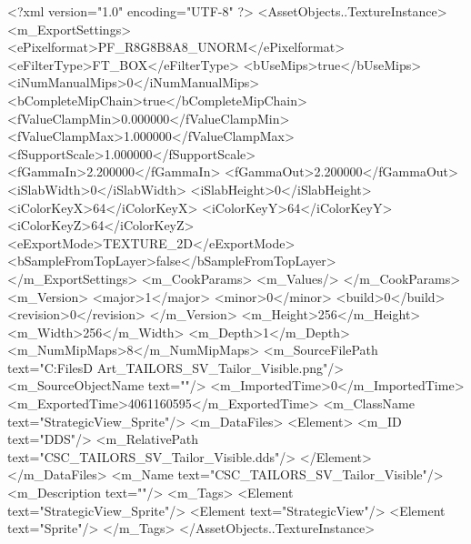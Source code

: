 <?xml version="1.0" encoding="UTF-8" ?>
<AssetObjects..TextureInstance>
	<m_ExportSettings>
		<ePixelformat>PF_R8G8B8A8_UNORM</ePixelformat>
		<eFilterType>FT_BOX</eFilterType>
		<bUseMips>true</bUseMips>
		<iNumManualMips>0</iNumManualMips>
		<bCompleteMipChain>true</bCompleteMipChain>
		<fValueClampMin>0.000000</fValueClampMin>
		<fValueClampMax>1.000000</fValueClampMax>
		<fSupportScale>1.000000</fSupportScale>
		<fGammaIn>2.200000</fGammaIn>
		<fGammaOut>2.200000</fGammaOut>
		<iSlabWidth>0</iSlabWidth>
		<iSlabHeight>0</iSlabHeight>
		<iColorKeyX>64</iColorKeyX>
		<iColorKeyY>64</iColorKeyY>
		<iColorKeyZ>64</iColorKeyZ>
		<eExportMode>TEXTURE_2D</eExportMode>
		<bSampleFromTopLayer>false</bSampleFromTopLayer>
	</m_ExportSettings>
	<m_CookParams>
		<m_Values/>
	</m_CookParams>
	<m_Version>
		<major>1</major>
		<minor>0</minor>
		<build>0</build>
		<revision>0</revision>
	</m_Version>
	<m_Height>256</m_Height>
	<m_Width>256</m_Width>
	<m_Depth>1</m_Depth>
	<m_NumMipMaps>8</m_NumMipMaps>
	<m_SourceFilePath text="C:\Users\Shadow\Desktop\Working Files\2D Art\Quarters\Tailors\StrategicView\CSC_TAILORS_SV_Tailor_Visible.png"/>
	<m_SourceObjectName text=""/>
	<m_ImportedTime>0</m_ImportedTime>
	<m_ExportedTime>4061160595</m_ExportedTime>
	<m_ClassName text="StrategicView_Sprite"/>
	<m_DataFiles>
		<Element>
			<m_ID text="DDS"/>
			<m_RelativePath text="CSC_TAILORS_SV_Tailor_Visible.dds"/>
		</Element>
	</m_DataFiles>
	<m_Name text="CSC_TAILORS_SV_Tailor_Visible"/>
	<m_Description text=""/>
	<m_Tags>
		<Element text="StrategicView_Sprite"/>
		<Element text="StrategicView"/>
		<Element text="Sprite"/>
	</m_Tags>
</AssetObjects..TextureInstance>

